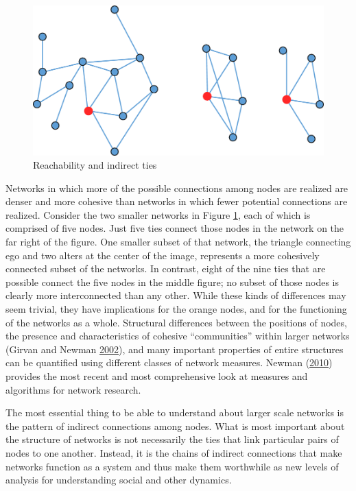 \documentclass[]{krantz}
\begin{document}
\begin{figure}

{\centering \includegraphics[width=0.7\linewidth]{ChapterNetworks/figures/fig8-4} 

}

\caption{Reachability and indirect ties}\label{fig:fig8-4}
\end{figure}

Networks in which more of the possible connections among nodes are
realized are denser and more cohesive than networks in which fewer
potential connections are realized. Consider the two smaller networks in
Figure \ref{fig:fig8-4}, each of which is comprised of five nodes. Just
five ties connect those nodes in the network on the far right of the
figure. One smaller subset of that network, the triangle connecting ego
and two alters at the center of the image, represents a more cohesively
connected subset of the networks. In contrast, eight of the nine ties
that are possible connect the five nodes in the middle figure; no subset
of those nodes is clearly more interconnected than any other. While
these kinds of differences may seem trivial, they have implications for
the orange nodes, and for the functioning of the networks as a whole.
Structural differences between the positions of nodes, the presence and
characteristics of cohesive ``communities'' within larger networks
(Girvan and Newman \protect\hyperlink{ref-girvan2002community}{2002}),
and many important properties of entire structures can be quantified
using different classes of network measures. Newman
(\protect\hyperlink{ref-newman2010networks}{2010}) provides the most
recent and most comprehensive look at measures and algorithms for
network research.

The most essential thing to be able to understand about larger scale
networks is the pattern of indirect connections among nodes. What is
most important about the structure of networks is not necessarily the
ties that link particular pairs of nodes to one another. Instead, it is
the chains of indirect connections that make networks function as a
system and thus make them worthwhile as new levels of analysis for
understanding social and other dynamics.
\end{document}
